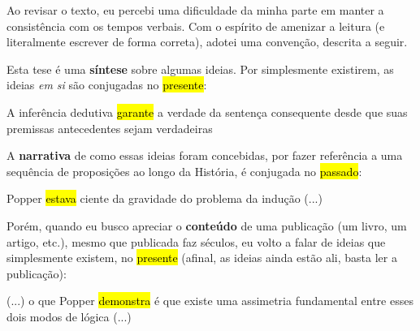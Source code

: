 \documentclass[./main.tex]{subfiles}
\begin{document}
\doublespacing %
\large

\newpage
\renewcommand{\headrulewidth}{0pt}
\thispagestyle{fancy}
\fancyhf{} %
\fancyfoot{} %
\fancyfoot[C]{\thepage}

\begin{center}
    \vspace{5mm}
\end{center}
\singlespacing
\normalsize

\noindent Ao revisar o texto, eu percebi uma dificuldade da minha parte em manter a consistência com os tempos verbais. Com o espírito de amenizar a leitura (e literalmente escrever de forma correta), adotei uma convenção, descrita a seguir.

\vspace{10mm}

\noindent Esta tese é uma \textbf{síntese} sobre algumas ideias. Por simplesmente existirem, as ideias \textit{em si} são conjugadas no \hl{presente}:

\begin{adjustwidth}{100pt}{0pt}
\medskip
\small
A inferência dedutiva \hl{garante} a verdade da sentença consequente desde que suas premissas antecedentes sejam verdadeiras
\medskip
\end{adjustwidth}

\noindent A \textbf{narrativa} de como essas ideias foram concebidas, por fazer referência a uma sequência de proposições ao longo da História, é conjugada no \hl{passado}:

\begin{adjustwidth}{100pt}{0pt}
\medskip
\small
Popper \hl{estava} ciente da gravidade do problema da indução (...)
\medskip
\end{adjustwidth}

\noindent Porém, quando eu busco apreciar o \textbf{conteúdo} de uma publicação (um livro, um artigo, etc.), mesmo que publicada faz séculos, eu volto a falar de ideias que simplesmente existem, no \hl{presente} (afinal, as ideias ainda estão ali, basta ler a publicação):

\begin{adjustwidth}{100pt}{0pt}
\medskip
\small
(...) o que Popper \hl{demonstra} é que existe uma assimetria fundamental entre esses dois modos de lógica (...)
\medskip
\end{adjustwidth}
\end{document}

